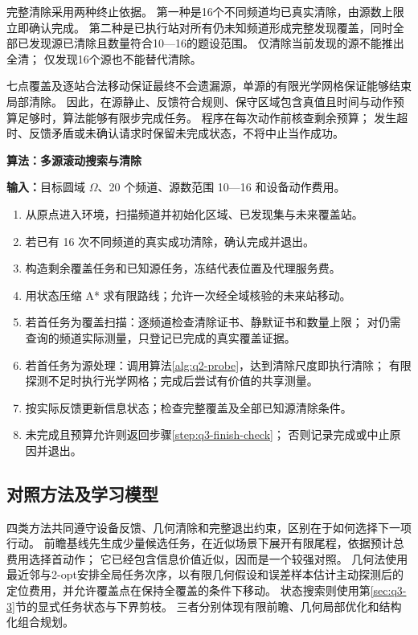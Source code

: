完整清除采用两种终止依据。
第一种是16个不同频道均已真实清除，由源数上限立即确认完成。
第二种是已执行站对所有仍未知频道形成完整发现覆盖，同时全部已发现源已清除且数量符合10---16的题设范围。
仅清除当前发现的源不能推出全清；
仅发现16个源也不能替代清除。

七点覆盖及逐站合法移动保证最终不会遗漏源，单源的有限光学网格保证能够结束局部清除。
因此，在源静止、反馈符合规则、保守区域包含真值且时间与动作预算足够时，算法能够有限步完成任务。
程序在每次动作前核查剩余预算；
发生超时、反馈矛盾或未确认请求时保留未完成状态，不将中止当作成功。

\par\noindent\begin{minipage}{\linewidth}
\label{alg:q3-search}
\textbf{算法\thealgorithm：多源滚动搜索与清除}

\small
\textbf{输入：}目标圆域 \(\Omega\)、20 个频道、源数范围 10---16 和设备动作费用。
\begin{enumerate}[label=\arabic*.,ref=\arabic*,leftmargin=2em,itemsep=2pt,topsep=4pt]
  \item 从原点进入环境，扫描频道并初始化区域、已发现集与未来覆盖站。
  \item\label{step:q3-finish-check} 若已有 16 次不同频道的真实成功清除，确认完成并退出。
  \item 构造剩余覆盖任务和已知源任务，冻结代表位置及代理服务费。
  \item 用状态压缩 A* 求有限路线；允许一次经全域核验的未来站移动。
  \item 若首任务为覆盖扫描：逐频道检查清除证书、静默证书和数量上限；
        对仍需查询的频道实际测量，只登记已完成的真实覆盖证据。
  \item 若首任务为源处理：调用算法\ref{alg:q2-probe}，达到清除尺度即执行清除；
        有限探测不足时执行光学网格；完成后尝试有价值的共享测量。
  \item 按实际反馈更新信息状态；检查完整覆盖及全部已知源清除条件。
  \item 未完成且预算允许则返回步骤\ref{step:q3-finish-check}；
        否则记录完成或中止原因并退出。
\end{enumerate}
\end{minipage}\par


\subsection{对照方法及学习模型}\label{sec:q3-7}

四类方法共同遵守设备反馈、几何清除和完整退出约束，区别在于如何选择下一项行动。
前瞻基线先生成少量候选任务，在近似场景下展开有限尾程，依据预计总费用选择首动作；
它已经包含信息价值近似，因而是一个较强对照。
几何法使用最近邻与2-opt安排全局任务次序，以有限几何假设和误差样本估计主动探测后的定位费用，并允许覆盖点在保持全覆盖的条件下移动。
状态搜索则使用第\ref{sec:q3-3}节的显式任务状态与下界剪枝。
三者分别体现有限前瞻、几何局部优化和结构化组合规划。

